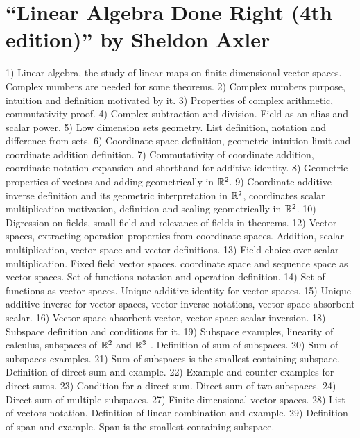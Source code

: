 




\section*{``Linear Algebra Done Right (4th edition)'' by Sheldon Axler}
\begin{multicols}{3}
  1) Linear algebra, the study of linear maps on finite-dimensional vector
  spaces. Complex numbers are needed for some theorems.
  2) Complex numbers purpose, intuition and definition motivated by it.
  3) Properties of complex arithmetic, commutativity proof.
  4) Complex subtraction and division. Field as an alias and scalar power.
  5) Low dimension sets geometry. List definition, notation and difference from
  sets.
  6) Coordinate space definition, geometric intuition limit and coordinate
  addition definition.
  7) Commutativity of coordinate addition, coordinate notation expansion and
  shorthand for additive identity.
  8) Geometric properties of vectors and adding geometrically in $\mathbb{R}^2$.
  9) Coordinate additive inverse definition and its geometric interpretation in
  $\mathbb{R}^2$, coordinates scalar multiplication motivation, definition and
  scaling geometrically in $\mathbb{R}^2$.
  10) Digression on fields, small field and relevance of fields in theorems.
  12) Vector spaces, extracting operation properties from coordinate spaces.
  Addition, scalar multiplication, vector space and vector definitions.
  13) Field choice over scalar multiplication. Fixed field vector spaces.
  coordinate space and sequence space as vector spaces. Set of functions notation
  and operation definition.
  14) Set of functions as vector spaces. Unique additive identity for vector
  spaces.
  15) Unique additive inverse for vector spaces, vector inverse notations,
  vector space absorbent scalar.
  16) Vector space absorbent vector, vector space scalar inversion.
  18) Subspace definition and conditions for it.
  19) Subspace examples, linearity of calculus, subspaces of $\mathbb{R}^2$ and
  $\mathbb{R}^3$ . Definition of sum of subspaces.
  20) Sum of subspaces examples.
  21) Sum of subspaces is the smallest containing subspace. Definition of direct
  sum and example.
  22) Example and counter examples for direct sums.
  23) Condition for a direct sum. Direct sum of two subspaces.
  24) Direct sum of multiple subspaces.
  27) Finite-dimensional vector spaces.
  28) List of vectors notation. Definition of linear combination and example.
  29) Definition of span and example. Span is the smallest containing subspace.

\end{multicols}
